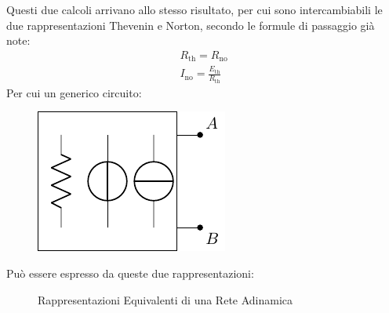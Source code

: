 \documentclass{article}
\numberwithin{equation}{subsection}
\begin{document}
Questi due calcoli arrivano allo stesso risultato, per cui sono intercambiabili le due rappresentazioni 
Thevenin e Norton, secondo le formule di passaggio già note:
\begin{gather*}
    R_\mathrm{th}=R_\mathrm{no}\\
    I_\mathrm{no}=\displaystyle\frac{E_\mathrm{th}}{R_\mathrm{th}}
\end{gather*} 
Per cui un generico circuito:
\begin{figure}[H]%
    \centering
    \includegraphics{rete-adinamica-generica.pdf}%
\end{figure}
Può essere espresso da queste due rappresentazioni:
\begin{figure}[H]%
    \centering
    \qquad
    \caption{Rappresentazioni Equivalenti di una Rete Adinamica}%
    \label{fig:rappresentazioni-equivalenti}
\end{figure}
\end{document}
